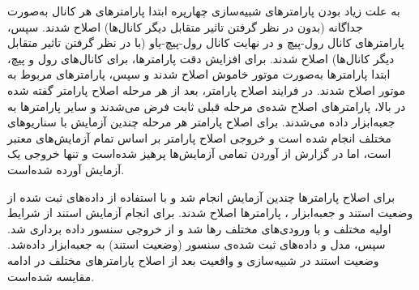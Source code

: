 به علت زیاد بودن پارامترهای شبیه‌سازی چهارپره ابتدا پارامترهای هر کانال به‌صورت جداگانه (بدون در نظر گرفتن تاثیر متقابل دیگر کانال‌‌ها) اصلاح شدند. سپس، پارامترهای کانال رول-پیچ و در نهایت کانال رول-پیچ-یاو  (با در نظر گرفتن تاثیر متقابل دیگر کانال‌‌ها) اصلاح شدند. برای افزایش دقت پارامترها، برای کانال‌های رول و پیچ، ابتدا پارامترها به‌صورت موتور خاموش اصلاح شدند و سپس، پارامترهای مربوط به موتور اصلاح شدند.
در فرایند اصلاح پارامتر، بعد از هر مرحله اصلاح پارامتر گفته شده در بالا،  پارامترهای اصلاح شده‌ی مرحله قبلی ثابت فرض می‌شدند و سایر پارامترها به جعبه‌ابزار
داده می‌شدند. برای اصلاح پارامتر هر مرحله چندین آزمایش با سناریوهای مختلف انجام شده است و خروجی اصلاح پارامتر بر اساس تمام آزمایش‌های معتبر است، اما در گزارش از آوردن تمامی آزمایش‌ها پرهیز شده‌است و تنها خروجی یک آزمایش آورده شده‌است.


برای اصلاح پارامترها چندین آزمایش انجام شد و با استفاده از داده‌های ثبت شده از وضعیت استند و جعبه‌ابزار
، پارامترها اصلاح شدند.
برای انجام آزمایش استند از شرایط اولیه مختلف و با ورودی‌های مختلف رها شد و از خروجی سنسور داده برداری شد. سپس، مدل و داده‌های ثبت شده‌ی سنسور (وضعیت استند) به جعبه‌ابزار
 داده‌شد. 
وضعیت استند در شبیه‌سازی و واقعیت بعد از اصلاح پارامترهای مختلف
در ادامه مقایسه شده‌است.











